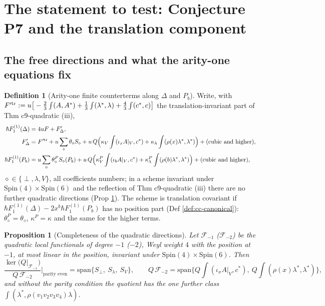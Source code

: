 \documentclass[11pt]{article}
\numberwithin{equation}{section}
\theoremstyle{plain}
\newtheorem{proposition}[theorem]{Proposition}
\theoremstyle{definition}
\newtheorem{definition}[theorem]{Definition}
\newcommand{\AV}{A|_V}
\begin{document}
\section{The statement to test: Conjecture P7 and the translation component}
\label{sec:cc-test}

\subsection{The free directions and what the arity-one equations fix}

\begin{definition}[Arity-one finite counterterms along $\Delta$ and $P_b$]
\label{def:cc-free}
Write, with $F'^{\rm tr}:=u\big[-\tfrac23\int(A,A^*)+\tfrac13\int(\lambda^*,\lambda)+\tfrac43\int(c^*,c)\big]$ the translation-invariant part of Thm c9-quadratic (iii),
\[
\begin{aligned}
\hbar F_1^{(1)}(\Delta)&=4uF+F'_\Delta,\\
F'_\Delta&=F'^{\rm tr}+u\sum_\diamond\theta_\diamond S_\diamond+u\,Q\Big(\kappa_V\int(\iota_x\AV,c^*)+\kappa_\lambda\int(\rho(x)\lambda^*,\lambda^*)\Big)+(\text{cubic and higher}),\\
\hbar F_1^{(1)}(P_b)&=u\sum_\diamond\theta^P_\diamond S_\diamond(P_b)+u\,Q\Big(\kappa^P_V\int(\iota_b\AV,c^*)+\kappa^P_\lambda\int(\rho(b)\lambda^*,\lambda^*)\Big)+(\text{cubic and higher}),
\end{aligned}
\]
$\diamond\in\{\perp,\lambda,V\}$, all coefficients numbers; in a scheme invariant under $\mathrm{Spin}(4)\times\mathrm{Spin}(6)$ and the reflection of Thm c9-quadratic (iii) there are no further quadratic directions (Prop \ref{prop:cc-tc0}). The scheme is translation covariant if $\hbar F_1^{(1)}(\Delta)-2x^b\hbar F_1^{(1)}(P_b)$ has no position part (Def \ref{def:cc-canonical}): $\theta^P_\diamond=\theta_\diamond$, $\kappa^P=\kappa$ and the same for the higher terms.
\end{definition}

\begin{proposition}[Completeness of the quadratic directions]
\label{prop:cc-tc0}
Let $\mathcal F_{-1}$ ($\mathcal F_{-2}$) be the quadratic local functionals of degree $-1$ ($-2$), Weyl weight $4$ with the position at $-1$, at most linear in the position, invariant under $\mathrm{Spin}(4)\times\mathrm{Spin}(6)$. Then
\[
\frac{\ker\big(Q|_{\mathcal F_{-1}}\big)}{Q\,\mathcal F_{-2}}\Big|_{\text{parity even}}=\mathrm{span}\{S_\perp,\ S_\lambda,\ S_V\},\qquad Q\,\mathcal F_{-2}=\mathrm{span}\Big\{Q\!\int(\iota_x\AV,c^*),\ Q\!\int(\rho(x)\lambda^*,\lambda^*)\Big\},
\]
and without the parity condition the quotient has the one further class $\int(\lambda^*,\rho(v_1v_2v_3v_4)\lambda)$.
\end{proposition}
\end{document}
